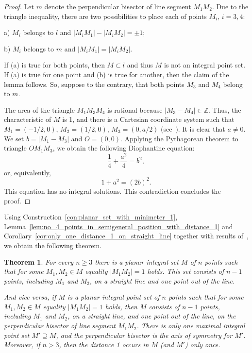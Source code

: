 \documentclass[a4paper,14pt]{article} %
\theoremstyle{plain}
\newtheorem{theorem}{Theorem}[section]
\theoremstyle{definition}
\begin{document}
\begin{proof}
	Let $m$ denote the perpendicular bisector of line segment $M_1 M_2$.
	Due to the triangle inequality, there are two possibilities to place each of points $M_i$, $i=3,4$:

	a) $M_i$ belongs to $l$ and $|M_i M_1|-|M_i M_2| = \pm 1$;

	b) $M_i$ belongs to $m$ and $|M_i M_1| = |M_i M_2|$.

	If (a) is true for both points, then $M\subset l$ and thus $M$ is not an integral point set.
	If (a) is true for one point and (b) is true for another, then the claim of the lemma follows.
	So, suppose to the contrary, that both points $M_3$ and $M_4$ belong to $m$.

	The area of the triangle $M_1 M_3 M_4$ is rational because $|M_3 - M_4| \in \mathbb{Z}$.
	Thus, the characteristic of $M$ is 1,
	and there is a Cartesian coordinate system such that $M_1=(-1/2,0)$, $M_2=(1/2,0)$, $M_3=(0, a/2)$
	(see~\cite[Theorem 4]{our-vmmsh-2018-translit}).
	It is clear that $a\neq 0$.
	We set $b = |M_1 - M_3|$ and $O=(0,0)$.
	Applying the Pythagorean theorem to triangle $OM_1M_3$, we obtain the following Diophantine equation:
	\begin{equation}
		\frac{1}{4} + \frac{a^2}{4} = b^2
		,
	\end{equation}
	or, equivalently,
	\begin{equation}
		1 + a^2 = (2b)^2
		.
	\end{equation}
	This equation has no integral solutions.
	This contradiction concludes the proof.
\end{proof}

Using Construction~\ref{con:planar_set_with_minimeter_1},
Lemma~\ref{lem:no_4_points_in_semigeneral_position_with_distance_1} and Corollary~\ref{cor:only_one_distance_1_on_straight_line}
together with results of~\cite[Section 6]{antonov2008maximal},
we obtain the following theorem.

\begin{theorem}
	\label{thm:minimeter_1_planar}
	For every $n\geq 3$ there is a planar integral set $M$ of $n$ points
	such that for some $M_1,M_2 \in M$ equality $|M_1 M_2|=1$ holds.
	This set consists of $n-1$ points, including $M_1$ and $M_2$, on a straight line and one point out of the line.

	And vice versa, if $M$ is a planar integral point set of $n$ points
	such that for some $M_1,M_2 \in M$ equality $|M_1 M_2|=1$ holds,
	then $M$ consists of $n-1$ points, including $M_1$ and $M_2$, on a straight line,
	and one point out of the line, on the perpendicular bisector of line segment $M_1 M_2$.
	There is only one maximal integral point set $M' \supseteq M$,
	and the perpendicular bisector is the axis of symmetry for $M'$.
	Moreover, if $n > 3$, then the distance 1 occurs in $M$ (and $M'$) only once.
\end{theorem}
\end{document}
